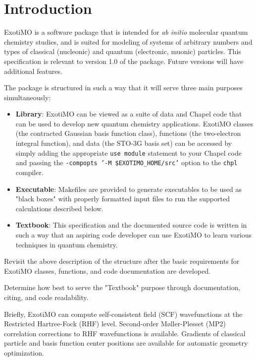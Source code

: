 \label{Scope}

\section{Introduction}

ExotiMO is a software package that is intended for \textit{ab initio} molecular quantum chemistry
studies, and is suited for modeling of systems of arbitrary numbers and types of 
classical (\eg nucleonic) and quantum (\eg electronic, muonic) particles. 
This specification is relevant to version 1.0 of the package. Future versions
will have additional features.

The package is structured in such a way that it will serve three main purposes simultaneously:
\begin{itemize}
\item \textbf{Library}: ExotiMO can be viewed as a suite of data and Chapel code that can be used to 
develop new quantum chemistry applications. ExotiMO classes (\eg the contracted Gaussian basis function class), 
functions (\eg the two-electron integral function), and data (\eg the STO-3G basis set) can be accessed 
by simply adding the appropriate \lstinline{use module} statement to your Chapel code and passing the
{\footnotesize\texttt{-compopts '-M \$EXOTIMO\_HOME/src'}} option to the 
\lstinline{chpl} compiler.
\item \textbf{Executable}: Makefiles are provided to generate executables to be used as "black boxes" with
properly formatted input files to run the supported calculations described below.
\item \textbf{Textbook}: This specification and the documented source code is written in such a way that an 
aspiring code developer can use ExotiMO to learn various techniques in quantum chemistry.
\end{itemize}

\begin{TODO}
Revisit the above description of the structure after the basic requirements for ExotiMO classes, 
functions, and code documentation are developed.
\end{TODO}

\begin{TODO}
Determine how best to serve the "Textbook" purpose through documentation, citing, and code readability.
\end{TODO}

Briefly, ExotiMO can compute self-consistent field (SCF) wavefunctions at the Restricted Hartree-Fock (RHF)
level. Second-order M\o ller-Plesset (MP2) correlation corrections to RHF wavefunctions is available. 
Gradients of classical particle and basis function center positions are available for automatic geometry optimization.  

